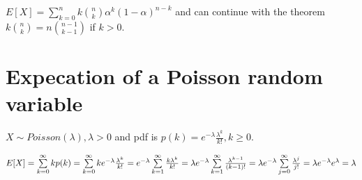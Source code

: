 \documentclass[12pt]{article}
\begin{document}
$E[X]
=\sum\limits_{k=0}^{n}k\binom{n}{k}\alpha^k(1-\alpha)^{n-k}$ and can continue
with the theorem $k\binom{n}{k}=n\binom{n-1}{k-1}$ if $k>0$.

\section{Expecation of a Poisson random variable}

$X\sim Poisson(\lambda),\lambda>0$ and pdf is $p(k)=e^{-\lambda}\frac{\lambda^k}{k!},k\ge 0$.

$E[X] \\
=\sum\limits_{k=0}^{\infty}kp(k)  \\
=\sum\limits_{k=0}^{\infty}ke^{-\lambda}\frac{\lambda^k}{k!} \\
=e^{-\lambda}\sum\limits_{k=1}^{\infty}\frac{k\lambda^k}{k!} \\
=\lambda e^{-\lambda}\sum\limits_{k=1}^{\infty}\frac{\lambda^{k-1}}{(k-1)!} \\
=\lambda e^{-\lambda}\sum\limits_{j=0}^{\infty}\frac{\lambda^j}{j!} \\
=\lambda e^{-\lambda}e^{\lambda} \\
=\lambda$
\end{document}
